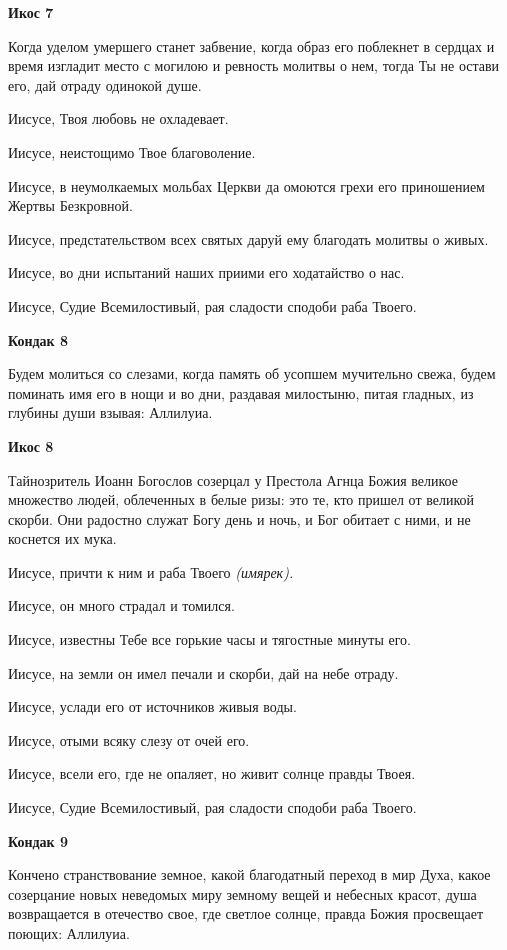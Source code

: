 \bfseries Икос 7\normalfont{}


Когда уделом умершего станет забвение, когда образ его поблекнет в сердцах и время изгладит место с могилою и ревность молитвы о нем, тогда Ты не остави его, дай отраду одинокой душе. 


Иисусе, Твоя любовь не охладевает. 


Иисусе, неистощимо Твое благоволение. 


Иисусе, в неумолкаемых мольбах Церкви да омоются грехи его приношением Жертвы Безкровной. 


Иисусе, предстательством всех святых даруй ему благодать молитвы о живых. 


Иисусе, во дни испытаний наших приими его ходатайство о нас. 


Иисусе, Судие Всемилостивый, рая сладости сподоби раба Твоего.




\bfseries Кондак 8\normalfont{}


Будем молиться со слезами, когда память об усопшем мучительно свежа, будем поминать имя его в нощи и во дни, раздавая милостыню, питая гладных, из глубины души взывая: Аллилуиа.




\bfseries Икос 8\normalfont{}


Тайнозритель Иоанн Богослов созерцал у Престола Агнца Божия великое множество людей, облеченных в белые ризы: это те, кто пришел от великой скорби. Они радостно служат Богу день и ночь, и Бог обитает с ними, и не коснется их мука. 


Иисусе, причти к ним и раба Твоего \itshape (имярек)\normalfont{}. 


Иисусе, он много страдал и томился. 


Иисусе, известны Тебе все горькие часы и тягостные минуты его. 


Иисусе, на земли он имел печали и скорби, дай на небе отраду. 


Иисусе, услади его от источников живыя воды. 


Иисусе, отыми всяку слезу от очей его. 


Иисусе, всели его, где не опаляет, но живит солнце правды Твоея. 


Иисусе, Судие Всемилостивый, рая сладости сподоби раба Твоего.




\bfseries Кондак 9\normalfont{}


Кончено странствование земное, какой благодатный переход в мир Духа, какое созерцание новых неведомых миру земному вещей и небесных красот, душа возвращается в отечество свое, где светлое солнце, правда Божия просвещает поющих: Аллилуиа.




